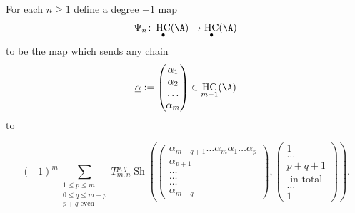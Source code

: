 \documentclass[12pt,a4paper,reqno]{amsart}
\DeclareMathOperator{\hochcx}{{HC}}
\DeclareMathOperator{\shfl}{{\mathrm{Sh}}}
\begin{document}
\begin{defn}
For each $n \geq 1$ define a degree $-1$ map 
$$ \Psi_n\colon \hochcx_\bullet(\A) \rightarrow \hochcx_\bullet(\A) $$
to be the map which sends any chain $$ 
\underline{\alpha} : = 
\left(
\begin{matrix}
\alpha_1 \\
\alpha_2 \\
\dots  \\
\alpha_m 
\end{matrix}
\right)
\in \hochcx_{m-1}(\A)
$$
to 
\begin{small}
\begin{equation}
\label{eqn-the-definition-of-the-map-psi}
(-1)^m
\sum_{
\begin{smallmatrix}
1 \leq p \leq m 
\\
0 \leq q \leq m-p 
\\
p + q \text{ even }
\end{smallmatrix}
}
T^{p,q}_{m,n}
\shfl\left(
\left(
\begin{matrix}
\alpha_{m-q+1} \dots \alpha_m \alpha_1 \dots \alpha_p \\
\alpha_{p+1} \\
\dots \\
\dots \\
\dots \\
\alpha_{m-q} 
\end{matrix}
\right), 
\left(
\begin{matrix}
1 \\
\dots \\
p+q+1 \\
\text{ in total } \\
\dots \\
1
\end{matrix}
\right)
\right).
\end{equation}
\end{small}
\end{defn}
\end{document}

